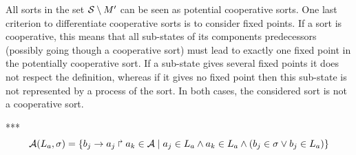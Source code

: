 All sorts in the set $\mathcal{S} \setminus M'$ can be seen as potential cooperative sorts. One last criterion to differentiate cooperative sorts is to consider fixed points. If a sort is cooperative, this means that all sub-states of its components predecessors (possibly going though a cooperative sort) must lead to exactly one fixed point in the potentially cooperative sort. If a sub-state gives several fixed points it does not respect the definition, whereas if it gives no fixed point then this sub-state is not represented by a process of the sort. In both cases, the considered sort is not a cooperative sort.

***
\[\mathcal A(L_a,\sigma) = \{ b_j\rightarrow a_j\Rsh a_k \in \mathcal A \mid 
	a_j\in L_a \wedge a_k\in L_a \wedge (b_j\in \sigma \vee b_j \in L_a) \}\]

